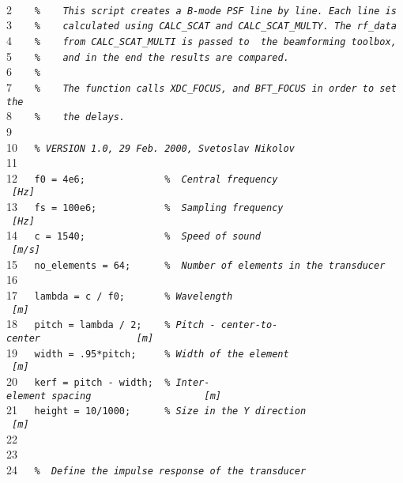 \documentclass{manual}
\begin{document}
{\footnotesize{}\\
2{\tt~~~~}{\tt {\sl \%~~~~This~script~creates~a~B-mode~PSF~line~by~line.~Each~line~is~}}\\
3{\tt~~~~}{\tt {\sl \%~~~~calculated~using~CALC\_SCAT~and~CALC\_SCAT\_MULTY.~The~rf\_data}}\\
4{\tt~~~~}{\tt {\sl \%~~~~from~CALC\_SCAT\_MULTI~is~passed~to~~the~beamforming~toolbox,}}\\
5{\tt~~~~}{\tt {\sl \%~~~~and~in~the~end~the~results~are~compared.}}\\
6{\tt~~~~}{\tt {\sl \%}}\\
7{\tt~~~~}{\tt {\sl \%~~~~The~function~calls~XDC\_FOCUS,~and~BFT\_FOCUS~in~order~to~set~the}}\\
8{\tt~~~~}{\tt {\sl \%~~~~the~delays.~}}\\
9{\tt~~~~}{\tt }\\
10{\tt~~~}{\tt {\sl \%~VERSION~1.0,~29~Feb.~2000,~Svetoslav~Nikolov}}\\
11{\tt~~~}{\tt }\\
12{\tt~~~}{\tt f0~=~4e6;~~~~~~~~~~~~~~{\sl \%~~Central~frequency~~~~~~~~~~~~~~~~~~~~~~~[Hz]}}\\
13{\tt~~~}{\tt fs~=~100e6;~~~~~~~~~~~~{\sl \%~~Sampling~frequency~~~~~~~~~~~~~~~~~~~~~~[Hz]}}\\
14{\tt~~~}{\tt c~=~1540;~~~~~~~~~~~~~~{\sl \%~~Speed~of~sound~~~~~~~~~~~~~~~~~~~~~~~~~~[m/s]}}\\
15{\tt~~~}{\tt no\_elements~=~64;~~~~~~{\sl \%~~Number~of~elements~in~the~transducer}}\\
16{\tt~~~}{\tt }\\
17{\tt~~~}{\tt lambda~=~c~/~f0;~~~~~~~{\sl \%~Wavelength~~~~~~~~~~~~~~~~~~~~~~~~~~~~~~~[m]}}\\
18{\tt~~~}{\tt pitch~=~lambda~/~2;~~~~{\sl \%~Pitch~-~center-to-center~~~~~~~~~~~~~~~~~[m]}}\\
19{\tt~~~}{\tt width~=~.95*pitch;~~~~~{\sl \%~Width~of~the~element~~~~~~~~~~~~~~~~~~~~~[m]}}\\
20{\tt~~~}{\tt kerf~=~pitch~-~width;~~{\sl \%~Inter-element~spacing~~~~~~~~~~~~~~~~~~~~[m]}}\\
21{\tt~~~}{\tt height~=~10/1000;~~~~~~{\sl \%~Size~in~the~Y~direction~~~~~~~~~~~~~~~~~~[m]}}\\
22{\tt~~~}{\tt ~}\\
23{\tt~~~}{\tt ~}\\
24{\tt~~~}{\tt {\sl \%~~Define~the~impulse~response~of~the~transducer}}\\
}
\end{document}
